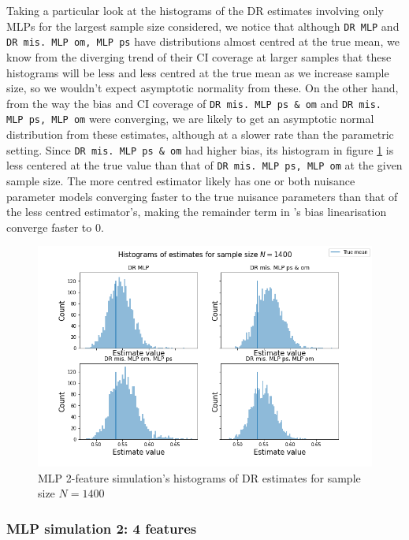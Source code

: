 \documentclass[12pt,twoside]{article}
\begin{document}
Taking a particular look at the histograms of the DR estimates involving only MLPs for the largest sample size considered, we notice that although \texttt{DR MLP} and \texttt{DR mis. MLP om, MLP ps} have distributions almost centred at the true mean, we know from the diverging trend of their CI coverage at larger samples that these histograms will be less and less centred at the true mean as we increase sample size, so we wouldn't expect asymptotic normality from these. On the other hand, from the way the bias and CI coverage of \texttt{DR mis. MLP ps \& om} and \texttt{DR mis. MLP ps, MLP om} were converging, we are likely to get an asymptotic normal distribution from these estimates, although at a slower rate than the parametric setting. Since \texttt{DR mis. MLP ps \& om} had higher bias, its histogram in figure \ref{fighistMLP} is less centered at the true value than that of \texttt{DR mis. MLP ps, MLP om} at the given sample size. The more centred estimator likely has one or both nuisance parameter models converging faster to the true nuisance parameters than that of the less centred estimator's, making the remainder term in \cite{benkeser2017}'s bias linearisation converge faster to 0.

\begin{figure}[h!]
    \centering
    \includegraphics[width = 0.9\columnwidth]{figures/histMLP.png}
    \caption{MLP 2-feature simulation's histograms of DR estimates for sample size $N = 1400$}
    \label{fighistMLP}
\end{figure}

\clearpage
\subsubsection{MLP simulation 2: 4 features}
\end{document}
